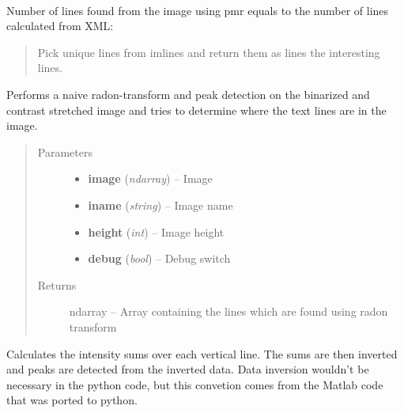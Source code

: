 \documentclass[letterpaper,10pt,english]{sphinxmanual}
\begin{document}
\begin{fulllineitems}
\begin{fulllineitems}
\begin{description}
\begin{gather}
\begin{split}
\\ ~\end{split}\notag\\\begin{split}\end{split}\notag
\end{gather}
Number of lines found from the image using pmr equals to
the number of lines calculated from XML:
\begin{quote}

Pick unique lines from imlines and return them as lines 
the interesting lines.
\end{quote}

\end{description}

\end{fulllineitems}


\begin{fulllineitems}
\label{code:OratUtils.OratUtils.poormanradon}
Performs a naive radon-transform and peak detection on the binarized 
and contrast stretched image and tries to determine where the text 
lines are in the image.
\begin{quote}\begin{description}
\item[{Parameters}] \leavevmode\begin{itemize}
\item {} 
\textbf{image} (\emph{ndarray}) -- Image

\item {} 
\textbf{iname} (\emph{string}) -- Image name

\item {} 
\textbf{height} (\emph{int}) -- Image height

\item {} 
\textbf{debug} (\emph{bool}) -- Debug switch

\end{itemize}

\item[{Returns}] \leavevmode
ndarray -- Array containing the lines which are found using radon transform

\end{description}\end{quote}

Calculates the intensity sums over each vertical line. The sums are then inverted and 
peaks are detected from the inverted data. Data inversion wouldn't be necessary in the 
python code, but this convetion comes from the Matlab code that was ported to python.


\end{fulllineitems}
\end{fulllineitems}
\end{document}
